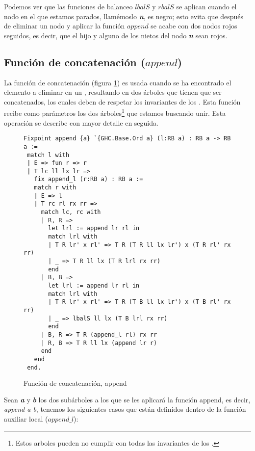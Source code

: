 Podemos ver que las funciones de balanceo $lbalS$ y $rbalS$ se aplican cuando el nodo en el que
estamos parados, llamémoslo \textbf{\textit{n}}, es negro; esto evita que después de eliminar un 
nodo y aplicar la funci\'on $append$ se acabe con dos nodos rojos seguidos, es decir, que el hijo y 
alguno de los nietos del nodo \textbf{\textit{n}} sean rojos.

\subsection{Funci\'on de concatenaci\'on ($append$)}

La funci\'on de concatenación (figura \ref{func_app}) es usada cuando se ha encontrado el elemento a eliminar
en un {\arn}, resultando
en dos \'arboles que tienen que ser concatenados, los cuales deben de respetar los invariantes de
los {\arns}. Esta funci\'on recibe como parámetros los dos \'arboles\footnote{Estos arboles pueden
no cumplir con todas las invariantes de los {\arns}.} que estamos buscando unir. Esta operación se describe
con mayor detalle en seguida.

\begin{figure}[!ht]
\centering
\captionsetup{justification=centering}
\begin{verbatim}
Fixpoint append {a} `{GHC.Base.Ord a} (l:RB a) : RB a -> RB a :=
 match l with
 | E => fun r => r
 | T lc ll lx lr =>
   fix append_l (r:RB a) : RB a :=
   match r with
   | E => l
   | T rc rl rx rr =>
     match lc, rc with
     | R, R =>
       let lrl := append lr rl in
       match lrl with
       | T R lr' x rl' => T R (T R ll lx lr') x (T R rl' rx rr)
       | _ => T R ll lx (T R lrl rx rr)
       end
     | B, B =>
       let lrl := append lr rl in
       match lrl with
       | T R lr' x rl' => T R (T B ll lx lr') x (T B rl' rx rr)
       | _ => lbalS ll lx (T B lrl rx rr)
       end
     | B, R => T R (append_l rl) rx rr
     | R, B => T R ll lx (append lr r)
     end
   end
 end.
\end{verbatim}
\caption{Funci\'on de concatenaci\'on, append}
\label{func_app}
\end{figure}


Sean \textbf{\textit{a}} y \textbf{\textit{b}} los dos subárboles a los que se les aplicar\'a la 
funci\'on append, es decir, \textit{append a b}, tenemos los siguientes casos que están definidos dentro de la funci\'on auxiliar local ($append\_l$):

